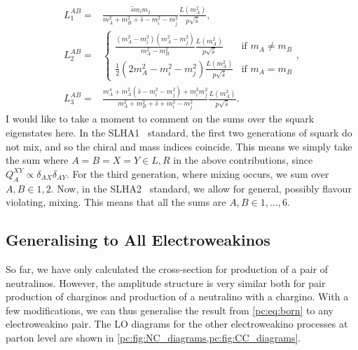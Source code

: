 \documentclass[../main.tex]{subfiles}
\begin{document}
\begin{subequations}
  \begin{align}
    L_1^{AB} = & \frac{\hat{s}m_i m_j}{m_A^2+m_B^2 + \hat{s} - m_i^2 - m_j^2} \frac{L(m_A^2)}{p \sqrt{\hat{s}}},                                                                                                                                                         \\
    L_2^{AB} = & \begin{cases}\frac{(m_A^2-m_i^2)(m_A^2-m_j^2)}{m_A^2-m_B^2} \frac{L(m_A^2)}{p \sqrt{\hat{s}}} & \text{if } m_A \neq m_B \\ \frac{1}{2}(2 m_A^2 - m_i^2 - m_j^2) \frac{L(m_A^2)}{p \sqrt{\hat{s}}} & \text{if } m_A = m_B \end{cases}, \\
    L_3^{AB} = & \frac{m_A^4 + m_A^2(\hat{s}-m_i^2-m_j^2) + m_i^2 m_j^2}{m_A^2+m_B^2 + \hat{s} + m_i^2 - m_j^2} \frac{L(m_A^2)}{p \sqrt{\hat{s}}}.
  \end{align}
\end{subequations}
I would like to take a moment to comment on the sums over the squark eigenstates here.
In the SLHA1~\cite{SLHA1} standard, the first two generations of squark do not mix, and so the chiral and mass indices coincide.
This means we simply take the sum where \(A = B = X = Y \in L, R\) in the above contributions, since \(Q_A^{XY} \propto \delta_{AX} \delta_{AY}\).
For the third generation, where mixing occurs, we sum over \(A, B \in 1, 2\).
Now, in the SLHA2~\cite{SLHA2} standard, we allow for general, possibly flavour violating, mixing.
This means that all the sums are \(A, B \in 1, \ldots, 6\).



\subsection{Generalising to All Electroweakinos}
So far, we have only calculated the cross-section for production of a pair of neutralinos.
However, the amplitude structure is very similar both for pair production of charginos and production of a neutralino with a chargino.
With a few modifications, we can thus generalise the result from \cref{pc:eq:born} to any electroweakino pair.
The LO diagrams for the other electroweakino processes at parton level are shown in \cref{pc:fig:NC_diagrams,pc:fig:CC_diagrams}.
\end{document}
